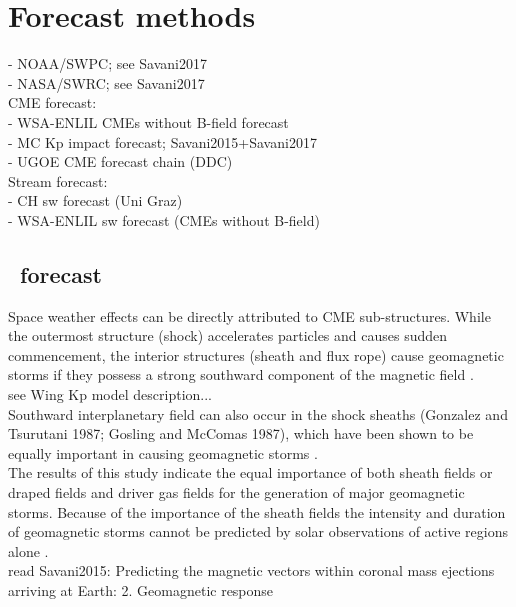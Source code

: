 \section{Forecast methods}

- NOAA/SWPC; see Savani2017\\
- NASA/SWRC; see Savani2017\\

CME forecast:\\
- WSA-ENLIL CMEs without B-field forecast\\
- MC Kp impact forecast; Savani2015+Savani2017\\
- UGOE CME forecast chain (DDC)\\

Stream forecast:\\
- CH sw forecast (Uni Graz)\\
- WSA-ENLIL sw forecast (CMEs without B-field)\\

\subsection{\Kp~forecast}

Space weather effects can be directly attributed to CME sub-structures. While the outermost structure (shock) accelerates particles and causes sudden commencement, the interior structures (sheath and flux rope) cause geomagnetic storms if they possess a strong southward component of the magnetic field \citep{Gopalswamy2016}.\\

see Wing Kp model description...\\

Southward interplanetary field can also occur in the shock sheaths (Gonzalez and Tsurutani 1987; Gosling and McComas 1987), which have been shown to be equally important in causing geomagnetic storms \citep{Tsurutani1988}.\\
The results of this study indicate the equal importance of both sheath fields or draped fields and driver gas fields for the generation of major geomagnetic storms. Because of the importance of the sheath fields the intensity and duration of geomagnetic storms cannot be predicted by solar observations of active regions alone \citep{Tsurutani1988}.\\

read Savani2015: Predicting the magnetic vectors within coronal mass ejections arriving at Earth: 2. Geomagnetic response\\

